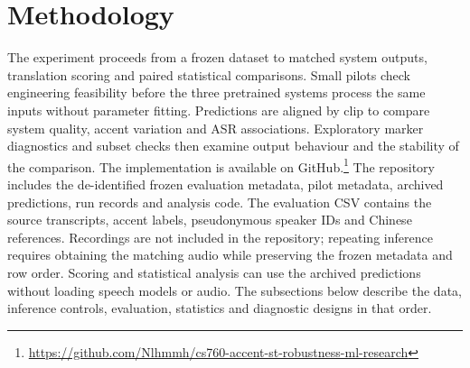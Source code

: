 \section{Methodology}
\label{sec:methodology}

The experiment proceeds from a frozen dataset to matched system outputs,
translation scoring and paired statistical comparisons. Small pilots check
engineering feasibility before the three pretrained systems process the same
inputs without parameter fitting. Predictions are aligned by clip to compare
system quality, accent variation and ASR associations. Exploratory marker
diagnostics and subset checks then examine output behaviour and the stability
of the comparison. The implementation is available on
GitHub.\footnote{\url{https://github.com/Nlhmmh/cs760-accent-st-robustness-ml-research}}
The repository includes the de-identified frozen evaluation metadata, pilot
metadata, archived predictions, run records and analysis code. The evaluation
CSV contains the source transcripts, accent labels, pseudonymous speaker IDs
and Chinese references. Recordings are not included in the repository;
repeating inference requires obtaining the matching audio while preserving
the frozen metadata and row order. Scoring and statistical analysis can use the
archived predictions without loading speech models or audio. The subsections
below describe the data, inference controls, evaluation, statistics and
diagnostic designs in that order.
